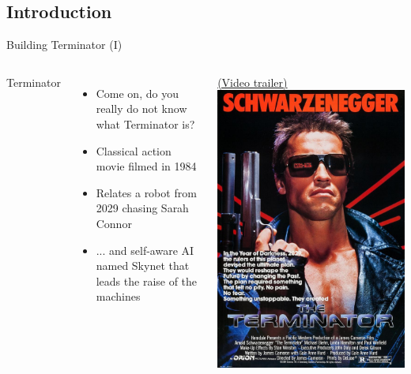 \documentclass[10pt,compress]{beamer} %
\begin{document}
\subsection{Introduction}

\begin{frame}{Building Terminator (I)}
	\begin{columns}
			Terminator
			\begin{itemize}
            \item Come on, do you really do not know what Terminator is?
			\item Classical action movie filmed in 1984
			\item Relates a robot from 2029 chasing Sarah Connor
            \item ... and self-aware AI named Skynet that leads the raise of the machines
			\end{itemize}
			\href{https://www.youtube.com/watch?v=k64P4l2Wmeg}{(Video trailer)}
		\includegraphics[width=\linewidth]{figs/terminator.jpg}\\
	\end{columns}
\end{frame}
\end{document}

